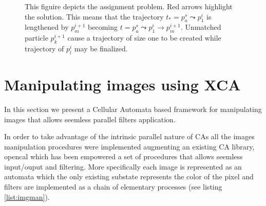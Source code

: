 \documentclass[conference]{IEEEtran}
\begin{document}
\begin{figure}
\caption{This figuire depicts the assignment problem. Red arrows highlight the solution. This means that the trajectory $t_*=p^s_a \leadsto p^i_1$  is lengthened by $p^{i+1}_m$ becoming $t=p^s_a \leadsto p^i_1 \to p^{i+1}_m$. Unmatched particle $p^{i+1}_k$ cause a  trajectory of size one to be created while trajectory of $p^{i}_l$ may be finalized.} \label{match}
\end{figure}



\section{Manipulating images using XCA}
In this section we present a Cellular Automata based framework for manipulating images that allows seemless parallel filters application.


	In order to take advantage of the intrinsic parallel nature of CAs all the images manipulation procedures were implemented augmenting an existing CA library, opencal\cite{dambrosio:2016} \cite{opencalurl} \cite{opencalmanual} which has been empowered  a set of procedures that allows seemless input/ouput and filtering.
	More specifically each image is represented as an automata which the only existing substate represents the color of the pixel and filters are implemented as a chain of elementary processes (see listing \ref{list:imgman}).
\end{document}
